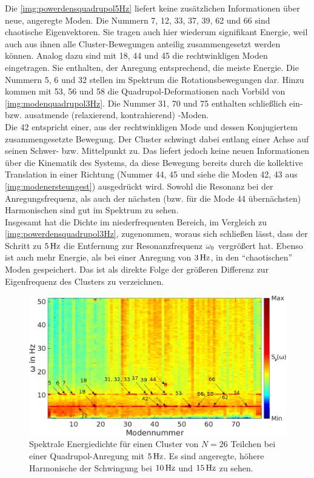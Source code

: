           Die \autoref{img:powerdensquadrupol5Hz} liefert keine zusätzlichen Informationen über neue, angeregte Moden. Die Nummern 7, 12, 33, 37, 39, 62 und 66 sind chaotische Eigenvektoren. Sie tragen auch hier wiederum signifikant Energie, weil auch aus ihnen alle Cluster-Bewegungen anteilig zusammengesetzt werden können. Analog dazu sind mit 18, 44 und 45 die rechtwinkligen Moden eingetragen. Sie enthalten, der Anregung entsprechend, die meiste Energie. Die Nummern 5, 6 und 32 stellen im Spektrum die Rotationsbewegungen dar.  Hinzu kommen mit 53, 56 und 58 die Quadrupol-Deformationen nach Vorbild von \autoref{img:modenquadrupol3Hz}. Die Nummer 31, 70 und 75 enthalten schließlich ein- bzw. ausatmende (relaxierend, kontrahierend) -Moden.\\
          Die 42 entspricht einer, aus der rechtwinkligen Mode und dessen Konjugiertem zusammengesetzte Bewegung. Der Cluster schwingt dabei entlang einer Achse auf seinen Schwer- bzw. Mittelpunkt zu. Das liefert jedoch keine neuen Informationen über die Kinematik des Systems, da diese Bewegung bereits durch die kollektive Translation in einer Richtung (Nummer 44, 45 und siehe die Moden 42, 43 aus \autoref{img:modenersteungest}) ausgedrückt wird. Sowohl die Resonanz bei der Anregungsfrequenz, als auch der nächsten (bzw. für die Mode 44 übernächsten) Harmonischen sind gut im Spektrum zu sehen.\\
          Insgesamt hat die Dichte im niederfrequenten Bereich, im Vergleich zu \autoref{img:powerdensquadrupol3Hz}, zugenommen, woraus sich schließen lässt, dass der Schritt zu $\unit[5]{Hz}$ die Entfernung zur Resonanzfrequenz $\omega_\text{0}$ vergrößert hat. Ebenso ist auch mehr Energie, als bei einer Anregung von $\unit[3]{Hz}$, in den "`chaotischen"' Moden gespeichert. Das ist als direkte Folge der größeren Differenz zur Eigenfrequenz des Clusters zu verzeichnen. 

            \begin{figure}[!t]
              \centering
              \includegraphics[width=\textwidth]{figs/auswertung/manipulation/quadrupol5Hzpowerdens.png}
              \caption{Spektrale Energiedichte für einen Cluster von $N=26$ Teilchen bei einer Quadrupol-Anregung mit $\unit[5]{Hz}$. Es sind angeregte, höhere Harmonische der Schwingung bei $\unit[10]{Hz}$  und $\unit[15]{Hz}$ zu sehen.}\label{img:powerdensquadrupol5Hz}
            \end{figure}

